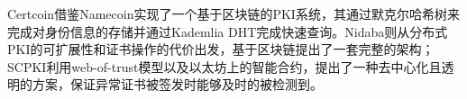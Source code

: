 

Certcoin\supercite{fromknecht2014decentralized}借鉴Namecoin实现了一个基于区块链的PKI系统，其通过默克尔哈希树来完成对身份信息的存储并通过Kademlia DHT完成快速查询。Nidaba\supercite{rystsovnidaba}则从分布式PKI的可扩展性和证书操作的代价出发，基于区块链提出了一套完整的架构；SCPKI\supercite{al2017scpki}利用web-of-trust模型以及以太坊上的智能合约，提出了一种去中心化且透明的方案，保证异常证书被签发时能够及时的被检测到。


























